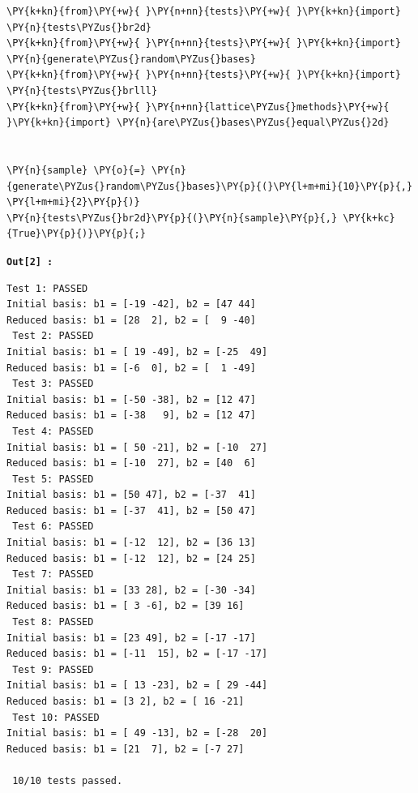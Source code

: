 \documentclass[a4paper,12pt]{article}
\begin{document}
    \begin{tcolorbox}[breakable, size=fbox, boxrule=1pt, pad at break*=1mm,colback=cellbackground, colframe=cellborder]
\begin{Verbatim}[commandchars=\\\{\}]
\PY{k+kn}{from}\PY{+w}{ }\PY{n+nn}{tests}\PY{+w}{ }\PY{k+kn}{import} \PY{n}{tests\PYZus{}br2d}
\PY{k+kn}{from}\PY{+w}{ }\PY{n+nn}{tests}\PY{+w}{ }\PY{k+kn}{import} \PY{n}{generate\PYZus{}random\PYZus{}bases}
\PY{k+kn}{from}\PY{+w}{ }\PY{n+nn}{tests}\PY{+w}{ }\PY{k+kn}{import} \PY{n}{tests\PYZus{}brlll}
\PY{k+kn}{from}\PY{+w}{ }\PY{n+nn}{lattice\PYZus{}methods}\PY{+w}{ }\PY{k+kn}{import} \PY{n}{are\PYZus{}bases\PYZus{}equal\PYZus{}2d}


\PY{n}{sample} \PY{o}{=} \PY{n}{generate\PYZus{}random\PYZus{}bases}\PY{p}{(}\PY{l+m+mi}{10}\PY{p}{,} \PY{l+m+mi}{2}\PY{p}{)}
\PY{n}{tests\PYZus{}br2d}\PY{p}{(}\PY{n}{sample}\PY{p}{,} \PY{k+kc}{True}\PY{p}{)}\PY{p}{;}
\end{Verbatim}
\end{tcolorbox}

\begin{tcolorbox}[colback=white, colframe=gray!60, boxrule=0.5pt]
\texttt{\textbf{Out[2] :}}

    \begin{Verbatim}[commandchars=\\\{\}]
 Test 1: PASSED
Initial basis: b1 = [-19 -42], b2 = [47 44]
Reduced basis: b1 = [28  2], b2 = [  9 -40]
 Test 2: PASSED
Initial basis: b1 = [ 19 -49], b2 = [-25  49]
Reduced basis: b1 = [-6  0], b2 = [  1 -49]
 Test 3: PASSED
Initial basis: b1 = [-50 -38], b2 = [12 47]
Reduced basis: b1 = [-38   9], b2 = [12 47]
 Test 4: PASSED
Initial basis: b1 = [ 50 -21], b2 = [-10  27]
Reduced basis: b1 = [-10  27], b2 = [40  6]
 Test 5: PASSED
Initial basis: b1 = [50 47], b2 = [-37  41]
Reduced basis: b1 = [-37  41], b2 = [50 47]
 Test 6: PASSED
Initial basis: b1 = [-12  12], b2 = [36 13]
Reduced basis: b1 = [-12  12], b2 = [24 25]
 Test 7: PASSED
Initial basis: b1 = [33 28], b2 = [-30 -34]
Reduced basis: b1 = [ 3 -6], b2 = [39 16]
 Test 8: PASSED
Initial basis: b1 = [23 49], b2 = [-17 -17]
Reduced basis: b1 = [-11  15], b2 = [-17 -17]
 Test 9: PASSED
Initial basis: b1 = [ 13 -23], b2 = [ 29 -44]
Reduced basis: b1 = [3 2], b2 = [ 16 -21]
 Test 10: PASSED
Initial basis: b1 = [ 49 -13], b2 = [-28  20]
Reduced basis: b1 = [21  7], b2 = [-7 27]

 10/10 tests passed.
    \end{Verbatim}
\end{tcolorbox}
\end{document}
